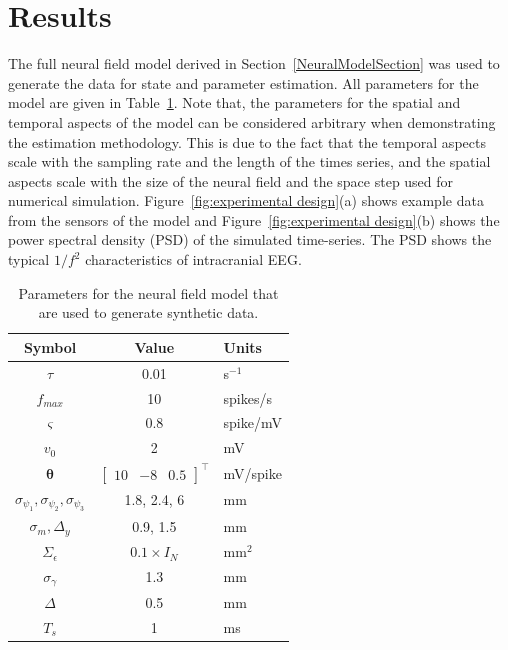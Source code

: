 \documentclass[10pt,a4paper]{article}
\begin{document}
\section{Results}\label{ResultsSection} The full neural field model derived in Section~\ref{NeuralModelSection} was used to generate the data for state and parameter estimation. All parameters for the model are given in Table~\ref{tab:Model Parameters}. Note that, the parameters for the spatial and temporal aspects of the model can be considered arbitrary when demonstrating the estimation methodology. This is due to the fact that the temporal aspects scale with the sampling rate and the length of the times series, and the spatial aspects scale with the size of the neural field and the space step used for numerical simulation. Figure~\ref{fig:experimental design}(a) shows example data from the sensors of the model and Figure~\ref{fig:experimental design}(b) shows the power spectral density (PSD) of the simulated time-series. The PSD shows the typical $1/f^2$ characteristics of intracranial EEG.
\begin{table}\footnotesize
\centering
\begin{tabular}{ccl}
	\hline\hline Symbol & Value & Units \\
	\hline\hline
	$\tau$ & 0.01 & s$^{-1}$\\
	$f_{max}$ & 10 & spikes/s \\
	$\varsigma$ & 0.8 & spike/mV\\
	$v_0$ & 2 & mV\\
	$\boldsymbol{\theta}$ & $\left[\begin{array}{ccc}
	10 &-8 &0.5
	\end{array}
	\right]^{\top}$ & mV/spike\\
	$\sigma_{\psi_{1}}, \sigma_{\psi_{2}}, \sigma_{\psi_{3}}$ & 1.8, 2.4, 6 & mm\\
	$\sigma_{m},\Delta_{y}$&0.9, 1.5&mm\\
	$\Sigma_{\epsilon}$ &$0.1 \times I_{N} $& mm$^2$ \\
	$\sigma_{\gamma}$&1.3&mm\\
	$\Delta$ & 0.5 & mm \\
	$T_s$ & 1 & ms \\ 
\end{tabular}
\caption{Parameters for the neural field model that are used to generate synthetic data.}
\label{tab:Model Parameters}
\end{table}
\end{document}
